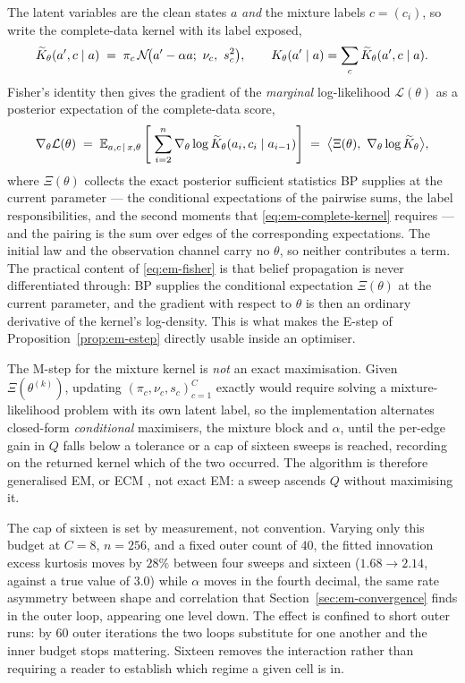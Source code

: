 The latent variables are the clean states $a$ \emph{and} the mixture labels
$c = (c_i)$, so write the complete-data kernel with its label exposed,
\begin{equation}
  \widetilde K_\theta(a', c \mid a)
  \;=\; \pi_c\, \mathcal{N}\!\big(a' - \alpha a;\ \nu_c,\ s_c^2\big),
  \qquad
  K_\theta(a' \mid a) = \sum_{c} \widetilde K_\theta(a', c \mid a).
  \label{eq:em-complete-kernel}
\end{equation}
Fisher's identity then gives the gradient of the \emph{marginal}
log-likelihood $\mathcal L(\theta)$ as a posterior expectation of the
complete-data score,
\begin{equation}
  \nabla_\theta \mathcal L(\theta)
  \;=\; \mathbb{E}_{a, c \,\mid\, x, \theta}
        \left[\; \sum_{i=2}^{n}
        \nabla_\theta \log \widetilde K_\theta(a_i, c_i \mid a_{i-1}) \right]
  \;=\; \big\langle \Xi(\theta),\ \nabla_\theta \log \widetilde K_\theta \big\rangle ,
  \label{eq:em-fisher}
\end{equation}
where $\Xi(\theta)$ collects the exact posterior sufficient statistics BP
supplies at the current parameter --- the conditional expectations of the
pairwise sums, the label responsibilities, and the second moments that
\eqref{eq:em-complete-kernel} requires --- and the pairing is the sum over
edges of the corresponding expectations. The initial law and the observation
channel carry no $\theta$, so neither contributes a term.
The practical content of \eqref{eq:em-fisher} is that belief propagation is
never differentiated through: BP supplies the conditional expectation
$\Xi(\theta)$ at the current parameter, and the gradient with respect to
$\theta$ is then an ordinary derivative of the kernel's log-density. This
is what makes the E-step of Proposition~\ref{prop:em-estep} directly usable
inside an optimiser.

The M-step for the mixture kernel is \emph{not} an exact maximisation. Given
$\Xi(\theta^{(k)})$, updating $(\pi_c,\nu_c,s_c)_{c=1}^C$ exactly would
require solving a mixture-likelihood problem with its own latent label, so
the implementation alternates closed-form \emph{conditional} maximisers, the mixture block and $\alpha$, until the per-edge gain in $Q$ falls below
a tolerance or a cap of sixteen sweeps is reached, recording on the returned
kernel which of the two occurred. The algorithm is therefore generalised EM,
or ECM \citep{meng1993maximum}, not exact EM: a sweep ascends $Q$
without maximising it.

The cap of sixteen is set by measurement, not convention. Varying only this
budget at $C=8$, $n=256$, and a fixed outer count of $40$, the fitted
innovation excess kurtosis moves by $28\%$ between four sweeps and sixteen
($1.68 \to 2.14$, against a true value of $3.0$) while $\alpha$ moves in the
fourth decimal, the same rate asymmetry between shape and correlation that
Section~\ref{sec:em-convergence} finds in the outer loop, appearing one level
down. The effect is confined to short outer runs: by $60$ outer iterations
the two loops substitute for one another and the inner budget stops
mattering. Sixteen removes the interaction rather than requiring a reader to
establish which regime a given cell is in.

